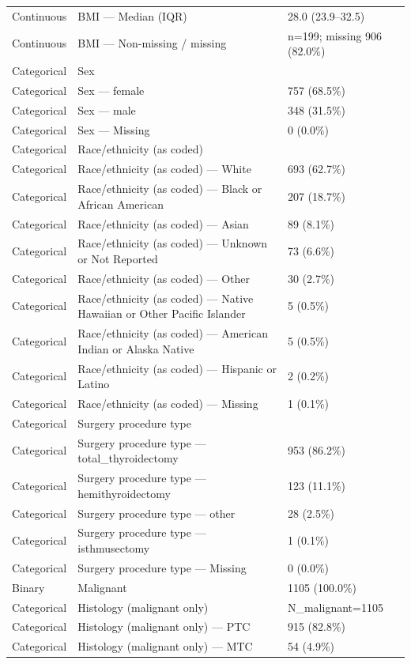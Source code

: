 \begin{table}[htbp]
\begin{tabular}{lll}
Continuous & BMI — Median (IQR) & 28.0 (23.9–32.5) \\
Continuous & BMI — Non-missing / missing & n=199; missing 906 (82.0\%) \\
Categorical & Sex &  \\
Categorical & Sex — female & 757 (68.5\%) \\
Categorical & Sex — male & 348 (31.5\%) \\
Categorical & Sex — Missing & 0 (0.0\%) \\
Categorical & Race/ethnicity (as coded) &  \\
Categorical & Race/ethnicity (as coded) — White & 693 (62.7\%) \\
Categorical & Race/ethnicity (as coded) — Black or African American & 207 (18.7\%) \\
Categorical & Race/ethnicity (as coded) — Asian & 89 (8.1\%) \\
Categorical & Race/ethnicity (as coded) — Unknown or Not Reported & 73 (6.6\%) \\
Categorical & Race/ethnicity (as coded) — Other & 30 (2.7\%) \\
Categorical & Race/ethnicity (as coded) — Native Hawaiian or Other Pacific Islander & 5 (0.5\%) \\
Categorical & Race/ethnicity (as coded) — American Indian or Alaska Native & 5 (0.5\%) \\
Categorical & Race/ethnicity (as coded) — Hispanic or Latino & 2 (0.2\%) \\
Categorical & Race/ethnicity (as coded) — Missing & 1 (0.1\%) \\
Categorical & Surgery procedure type &  \\
Categorical & Surgery procedure type — total\_thyroidectomy & 953 (86.2\%) \\
Categorical & Surgery procedure type — hemithyroidectomy & 123 (11.1\%) \\
Categorical & Surgery procedure type — other & 28 (2.5\%) \\
Categorical & Surgery procedure type — isthmusectomy & 1 (0.1\%) \\
Categorical & Surgery procedure type — Missing & 0 (0.0\%) \\
Binary & Malignant & 1105 (100.0\%) \\
Categorical & Histology (malignant only) & N\_malignant=1105 \\
Categorical & Histology (malignant only) — PTC & 915 (82.8\%) \\
Categorical & Histology (malignant only) — MTC & 54 (4.9\%) \\

\end{tabular}
\end{table}
